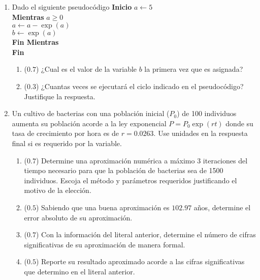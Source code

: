 \documentclass[12pt]{article}
\begin{document}
\vspace{-.5cm}
  \begin{enumerate}[leftmargin=*,widest=9]
    \item Dado el siguiente pseudocódigo
\textbf{Inicio}
\(a\gets 5\)\\
\textbf{Mientras} \(a \geq 0\)\\
\hspace*{1cm}\(a \gets a - \exp(a)\)\\
\hspace*{1cm}\(b \gets \exp(a) \)\\
\textbf{Fin Mientras}\\
\textbf{Fin}
\vspace{-0.5cm}
    \begin{enumerate}[label=\alph*]
    \item (\(0.7\)) ¿Cual es el valor de la variable \(b\) la primera vez que es asignada?
\vspace{1.5cm}
    \item (\(0.3\)) ¿Cuantas veces se ejecutará el ciclo indicado en el pseudocódigo? Justifique la respuesta.
\vspace{1.5cm}
    \end{enumerate}
    \item Un cultivo de bacterias con una población inicial (\(P_0\)) de 100 individuos aumenta su población acorde a la ley exponencial \(P = P_0\exp(rt)\) donde su tasa de crecimiento por hora es de \(r=0.0263\). Use unidades en la respuesta final si es requerido por la variable.
    \begin{enumerate}[label=\alph*]
    \item (\(0.7\)) Determine una aproximación numérica a máximo 3 iteraciones del tiempo necesario para que la población de bacterias sea de 1500 individuos. Escoja el método y parámetros requeridos justificando el motivo de la elección.
\vspace*{5cm}
    \item (\(0.5\)) Sabiendo que una buena aproximación es \(102.97\) años, determine el error absoluto de su aproximación.
\vspace{1cm}
    \item (\(0.7\)) Con la información del literal anterior, determine el número de cifras significativas de su aproximación de manera formal.
\vspace{3cm}
\item (\(0.5\)) Reporte su resultado aproximado acorde a las cifras significativas que determino en el literal anterior.

\end{enumerate}
\end{enumerate}
\end{document}
